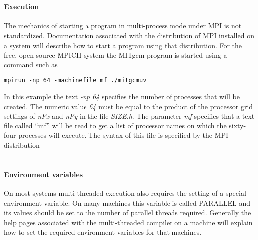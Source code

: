  \\
\paragraph{\bf Execution} The mechanics of starting a program in 
multi-process mode under MPI is not standardized. Documentation 
associated with the distribution of MPI installed on a system will
describe how to start a program using that distribution.
For the free, open-source MPICH system the MITgcm program is started
using a command such as
\begin{verbatim}
mpirun -np 64 -machinefile mf ./mitgcmuv
\end{verbatim}
In this example the text {\em -np 64} specifies the number of processes 
that will be created. The numeric value {\em 64} must be equal to the
product of the processor grid settings of {\em nPx} and {\em nPy}
in the file {\em SIZE.h}. The parameter {\em mf} specifies that a text file
called ``mf'' will be read to get a list of processor names on
which the sixty-four processes will execute. The syntax of this file
is specified by the MPI distribution
\\ 

 \\


\paragraph{Environment variables}
On most systems multi-threaded execution also requires the setting
of a special environment variable. On many machines this variable
is called PARALLEL and its values should be set to the number
of parallel threads required. Generally the help pages associated
with the multi-threaded compiler on a machine will explain
how to set the required environment variables for that machines.

